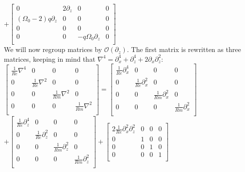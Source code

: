 \documentclass[letterpaper,12pt]{article}
\newcommand\reye{\mathrel{Re}}
\newcommand\reym{\mathrel{Rm}}
\begin{document}
$+ \left[\begin{matrix}
0 & 2\partial_z & 0 & 0 \\
\left(\Omega_0 - 2\right)q\partial_z & 0 & 0 & 0 \\
0 & 0 & 0 & 0 \\
0 & 0 & -q\Omega_0\partial_z & 0 \\ \end{matrix}\right]$ \\

We will now regroup matrices by $\mathcal{O}(\partial_z)$. The first matrix is rewritten as three matrices, keeping in mind that $\nabla^4 = \partial_x^4 + \partial_z^4 + 2\partial_x\partial_z^2$: \\

$\left[\begin{matrix}
\frac{1}{\reye} \nabla^4 & 0 & 0 & 0 \\
0 & \frac{1}{\reye}\nabla^2 & 0 & 0 \\
0 & 0 & \frac{1}{\reym}\nabla^2 & 0 \\
0 & 0 & 0 & \frac{1}{\reym}\nabla^2 \\ 
\end{matrix}\right] = \left[\begin{matrix}
\frac{1}{\reye}\partial_x^4 & 0 & 0 & 0 \\
0 & \frac{1}{\reye}\partial_x^2 & 0 &0 \\
0 & 0 & \frac{1}{\reym}\partial_x^2 & 0 \\
0 & 0 & 0 & \frac{1}{\reym}\partial_x^2 \\ \end{matrix}\right] $ \\

$+ \left[\begin{matrix}
\frac{1}{\reye}\partial_z^4 & 0 & 0 & 0 \\
0 & \frac{1}{\reye}\partial_z^2 & 0 & 0 \\
0 & 0 & \frac{1}{\reym} \partial_z^2 & 0 \\
0 & 0 & 0 & \frac{1}{\reym} \partial_z^2 \\ \end{matrix} \right] + \left[ \begin{matrix}
2 \frac{1}{\reye} \partial_x^2\partial_z^2 & 0 & 0 & 0 \\
0 & 1 & 0 & 0 \\
0 & 0 & 1 & 0 \\
0 & 0 & 0 & 1\\ \end{matrix}\right]$ \\
\end{document}
